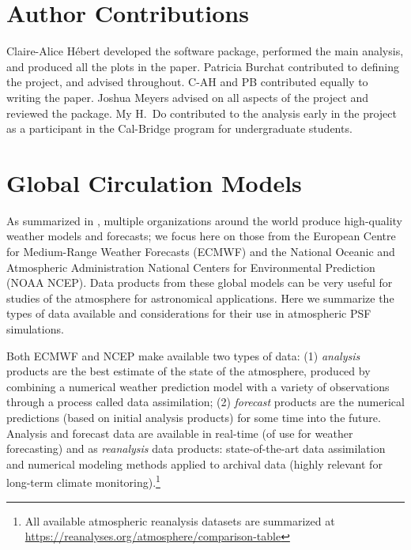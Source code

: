 \documentclass[twocolumn]{aastex631}
\begin{document}

\section*{Author Contributions}

Claire-Alice H\'ebert developed the \psfws software package, performed the main analysis, and produced all the plots in the paper.
Patricia Burchat contributed to defining the project, and advised throughout.
C-AH and PB contributed equally to writing the paper. 
Joshua Meyers advised on all aspects of the project and reviewed the \psfws package.
My H.~Do contributed to the analysis early in the project as a participant in the Cal-Bridge program for undergraduate students.


\vspace{5mm}




\appendix
\twocolumngrid
\section*{Global Circulation Models}\label{app:gcm}
As summarized in , multiple organizations around the world produce high-quality weather models and forecasts; we focus here on those from the European Centre for Medium-Range Weather Forecasts (ECMWF) and the National Oceanic and Atmospheric Administration National Centers for Environmental Prediction (NOAA NCEP). 
Data products from these global models can be very useful for studies of the atmosphere for astronomical applications.
Here we summarize the types of data available and considerations for their use in atmospheric PSF simulations.

Both ECMWF and NCEP make available two types of data: 
(1) \textit{analysis} products are the best estimate of the state of the atmosphere, produced by combining a numerical weather prediction model with a variety of observations through a process called data assimilation; 
(2) \textit{forecast} products are the numerical predictions (based on initial analysis products) for some time into the future.
Analysis and forecast data are available in real-time (of use for weather forecasting) and as \textit{reanalysis} data products: state-of-the-art data assimilation and numerical modeling methods applied to archival data (highly relevant for long-term climate monitoring).\footnote{All available atmospheric reanalysis datasets are summarized at \url{https://reanalyses.org/atmosphere/comparison-table}}
\end{document}
